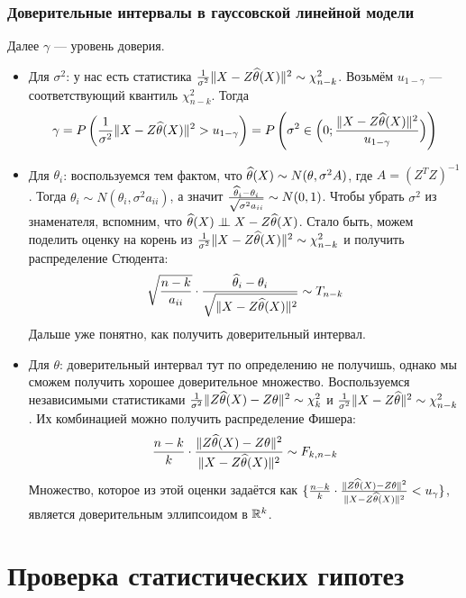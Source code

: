 \subsubsection{Доверительные интервалы в гауссовской линейной модели}

Далее $\gamma$ --- уровень доверия.

\begin{itemize}
	\item Для $\sigma^2$: у нас есть статистика $\frac{1}{\sigma^2}\|X - Z\widehat{\theta}(X)\|^2 \sim \chi_{n - k}^2$. Возьмём $u_{1 - \gamma}$ --- соответствующий квантиль $\chi_{n - k}^2$. Тогда
	\[
		\gamma = P\left(\frac{1}{\sigma^2}\|X - Z\widehat{\theta}(X)\|^2 > u_{1 - \gamma}\right) = P\left(\sigma^2 \in \Big(0; \frac{\|X - Z\widehat{\theta}(X)\|^2}{u_{1 - \gamma}}\Big)\right)
	\]
	
	\item Для $\theta_i$: воспользуемся тем фактом, что $\widehat{\theta}(X) \sim N(\theta, \sigma^2A)$, где $A = (Z^TZ)^{-1}$. Тогда $\theta_i \sim N(\theta_i, \sigma^2a_{ii})$, а значит $\frac{\widehat{\theta}_i - \theta_i}{\sqrt{\sigma^2a_{ii}}} \sim N(0, 1)$. Чтобы убрать $\sigma^2$ из знаменателя, вспомним, что $\widehat{\theta}(X) \perp\mkern-9.5mu\perp X - Z\widehat{\theta}(X)$. Стало быть, можем поделить оценку на корень из $\frac{1}{\sigma^2}\|X - Z\widehat{\theta}(X)\|^2 \sim \chi_{n - k}^2$ и получить распределение Стюдента:
	\[
		\sqrt{\frac{n - k}{a_{ii}}} \cdot \frac{\widehat{\theta}_i - \theta_i}{\sqrt{\|X - Z\widehat{\theta}(X)\|^2}} \sim T_{n - k}
	\]
	Дальше уже понятно, как получить доверительный интервал.
	
	\item Для $\theta$: доверительный интервал тут по определению не получишь, однако мы сможем получить хорошее доверительное множество. Воспользуемся независимыми статистиками $\frac{1}{\sigma^2}\|Z\widehat{\theta}(X) - Z\theta\|^2 \sim \chi_k^2$ и $\frac{1}{\sigma^2}\|X - Z\widehat{\theta}\|^2 \sim \chi_{n - k}^2$. Их комбинацией можно получить распределение Фишера:
	\[
		\frac{n - k}{k} \cdot \frac{\|Z\widehat{\theta}(X) - Z\theta\|^2}{\|X - Z\widehat{\theta}(X)\|^2} \sim F_{k, n - k}
	\]
	Множество, которое из этой оценки задаётся как $\{\frac{n - k}{k} \cdot \frac{\|Z\widehat{\theta}(X) - Z\theta\|^2}{\|X - Z\widehat{\theta}(X)\|^2} < u_\gamma\}$, является доверительным эллипсоидом в $\mathbb{R}^k$.
\end{itemize}

\section{Проверка статистических гипотез}


